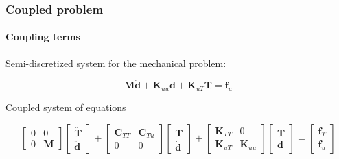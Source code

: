 \documentclass[10pt,xcolor=pdftex,dvipsnames,table]{beamer}
\begin{document}
\begin{frame}
	\frametitle{ Coupled problem }
	\framesubtitle{ Coupling terms  }
	
	
	Semi-discretized system for the mechanical problem:
	
	\begin{equation*}
		\mathbf{M}\ddot{\boldsymbol{d}}+\mathbf{K}_{uu}\boldsymbol{d}+\mathbf{K}_{uT}\boldsymbol{T}=\boldsymbol{f}_u
	\end{equation*}	
	
	
	
	\begin{block}{Coupled system of equations}
	
		\begin{equation*}
			\begin{bmatrix}
				0 & 0 \\
				0 & \mathbf{M} 
			\end{bmatrix}
			\begin{bmatrix}
				\ddot{\boldsymbol{T}} \\
				\ddot{\boldsymbol{d}} 
			\end{bmatrix}		
		+
			\begin{bmatrix}
				\mathbf{C}_{TT} & \mathbf{C}_{Tu} \\
				0 & 0 
			\end{bmatrix}
			\begin{bmatrix}
				\dot{\boldsymbol{T}} \\
				\dot{\boldsymbol{d}} 
			\end{bmatrix}
		+
			\begin{bmatrix}
				\mathbf{K}_{TT} & 0 \\
				\mathbf{K}_{uT} & \mathbf{K}_{uu} 
			\end{bmatrix}
			\begin{bmatrix}
				\boldsymbol{T} \\
				\boldsymbol{d} 
			\end{bmatrix}
			=
			\begin{bmatrix}
				\boldsymbol{f}_T \\
				\boldsymbol{f}_u 
			\end{bmatrix}				
		\end{equation*}		
	\end{block}

\end{frame}


\end{document}

